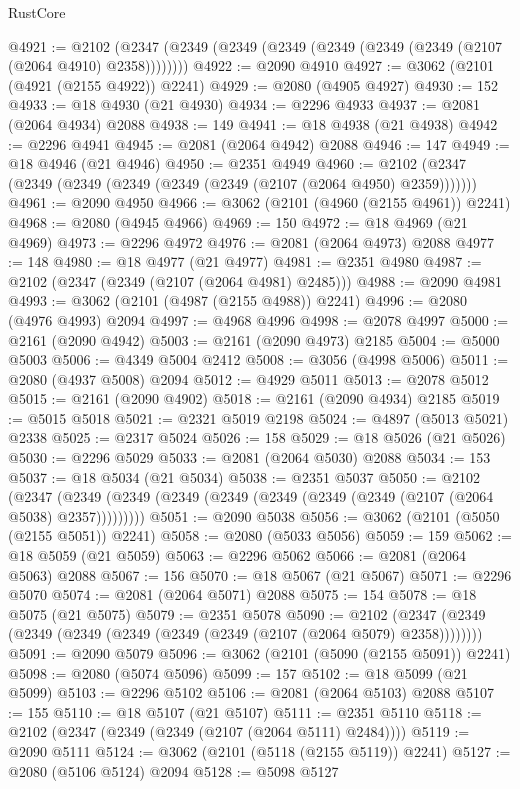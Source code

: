 \begin{lexlean}{RustCore}
\begin{coremodule}
@4921 := @2102 (@2347 (@2349 (@2349 (@2349 (@2349 (@2349 (@2349 (@2107 (@2064 @4910) @2358))))))))
@4922 := @2090 @4910
@4927 := @3062 (@2101 (@4921 (@2155 @4922)) @2241)
@4929 := @2080 (@4905 @4927)
@4930 := 152
@4933 := @18 @4930 (@21 @4930)
@4934 := @2296 @4933
@4937 := @2081 (@2064 @4934) @2088
@4938 := 149
@4941 := @18 @4938 (@21 @4938)
@4942 := @2296 @4941
@4945 := @2081 (@2064 @4942) @2088
@4946 := 147
@4949 := @18 @4946 (@21 @4946)
@4950 := @2351 @4949
@4960 := @2102 (@2347 (@2349 (@2349 (@2349 (@2349 (@2349 (@2107 (@2064 @4950) @2359)))))))
@4961 := @2090 @4950
@4966 := @3062 (@2101 (@4960 (@2155 @4961)) @2241)
@4968 := @2080 (@4945 @4966)
@4969 := 150
@4972 := @18 @4969 (@21 @4969)
@4973 := @2296 @4972
@4976 := @2081 (@2064 @4973) @2088
@4977 := 148
@4980 := @18 @4977 (@21 @4977)
@4981 := @2351 @4980
@4987 := @2102 (@2347 (@2349 (@2107 (@2064 @4981) @2485)))
@4988 := @2090 @4981
@4993 := @3062 (@2101 (@4987 (@2155 @4988)) @2241)
@4996 := @2080 (@4976 @4993) @2094
@4997 := @4968 @4996
@4998 := @2078 @4997
@5000 := @2161 (@2090 @4942)
@5003 := @2161 (@2090 @4973) @2185
@5004 := @5000 @5003
@5006 := @4349 @5004 @2412
@5008 := @3056 (@4998 @5006)
@5011 := @2080 (@4937 @5008) @2094
@5012 := @4929 @5011
@5013 := @2078 @5012
@5015 := @2161 (@2090 @4902)
@5018 := @2161 (@2090 @4934) @2185
@5019 := @5015 @5018
@5021 := @2321 @5019 @2198
@5024 := @4897 (@5013 @5021) @2338
@5025 := @2317 @5024
@5026 := 158
@5029 := @18 @5026 (@21 @5026)
@5030 := @2296 @5029
@5033 := @2081 (@2064 @5030) @2088
@5034 := 153
@5037 := @18 @5034 (@21 @5034)
@5038 := @2351 @5037
@5050 := @2102
    (@2347 (@2349 (@2349 (@2349 (@2349 (@2349 (@2349 (@2349 (@2107 (@2064 @5038) @2357)))))))))
@5051 := @2090 @5038
@5056 := @3062 (@2101 (@5050 (@2155 @5051)) @2241)
@5058 := @2080 (@5033 @5056)
@5059 := 159
@5062 := @18 @5059 (@21 @5059)
@5063 := @2296 @5062
@5066 := @2081 (@2064 @5063) @2088
@5067 := 156
@5070 := @18 @5067 (@21 @5067)
@5071 := @2296 @5070
@5074 := @2081 (@2064 @5071) @2088
@5075 := 154
@5078 := @18 @5075 (@21 @5075)
@5079 := @2351 @5078
@5090 := @2102 (@2347 (@2349 (@2349 (@2349 (@2349 (@2349 (@2349 (@2107 (@2064 @5079) @2358))))))))
@5091 := @2090 @5079
@5096 := @3062 (@2101 (@5090 (@2155 @5091)) @2241)
@5098 := @2080 (@5074 @5096)
@5099 := 157
@5102 := @18 @5099 (@21 @5099)
@5103 := @2296 @5102
@5106 := @2081 (@2064 @5103) @2088
@5107 := 155
@5110 := @18 @5107 (@21 @5107)
@5111 := @2351 @5110
@5118 := @2102 (@2347 (@2349 (@2349 (@2107 (@2064 @5111) @2484))))
@5119 := @2090 @5111
@5124 := @3062 (@2101 (@5118 (@2155 @5119)) @2241)
@5127 := @2080 (@5106 @5124) @2094
@5128 := @5098 @5127

\end{coremodule}
\end{lexlean}
